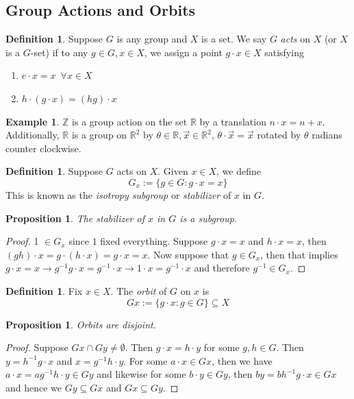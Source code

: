 \documentclass{article}
\newcommand{\R}{\mathbb{R}}
\newcommand{\Z}{\mathbb{Z}}
\newtheorem{proposition}[theorem]{Proposition}
\theoremstyle{definition}
\newtheorem{definition}[theorem]{Definition}
\newtheorem{example}[theorem]{Example}
\begin{document}
\subsection{Group Actions and Orbits}
\begin{definition}
    Suppose $G$ is any group and $X$ is a set. We say $G$ \emph{acts} on $X$ (or $X$ is a $G$-set) if to any $g\in G, x\in X$, we assign a point $g\cdot x \in X$ satisfying 
    \begin{enumerate}
        \item $e\cdot x=x\,\,\, \forall x\in X$
        \item $h\cdot (g\cdot x) = (hg)\cdot x$
    \end{enumerate}
\end{definition}
\begin{example}
    $\Z$ is a group action on the set $\R$ by a translation $n\cdot x=n+x$. Additionally, $\R$ is a group on $\R^2$ by $\theta \in \R, \vec{x}\in \R^2$, $\theta \cdot \vec{x} = \vec{x}$ rotated by $\theta$ radians counter clockwise. 
\end{example}
\begin{definition}
    Suppose $G$ acts on $X$. Given $x\in X$, we define 
    \begin{equation*}
        G_x := \{ g\in G: g\cdot x = x\}
    \end{equation*}
    This is known as the \emph{isotropy subgroup} or \emph{stabilizer} of $x$ in $G$.
\end{definition}
\begin{proposition}
    The stabilizer of $x$ in $G$ is a subgroup.
\end{proposition}
\begin{proof}
    1 $\in G_x$ since $1$ fixed everything. Suppose $g\cdot x=x $ and $h\cdot x=x$, then $(gh)\cdot x = g\cdot (h\cdot x) = g\cdot x=x$. Now suppose that $g\in G_x$, then that implies $g\cdot x= x \to g^{-1}g\cdot x=g^{-1}\cdot x\to 1\cdot x=g^{-1}\cdot x$ and therefore $g^{-1} \in G_x$.
\end{proof}
\begin{definition}
    Fix $x\in X$. The \emph{orbit} of $G$ on $x$ is 
    \begin{equation*}
        Gx := \{ g\cdot x: g\in G\} \subseteq X
    \end{equation*}
\end{definition}
\begin{proposition}
    Orbits are disjoint.
\end{proposition}
\begin{proof}
    Suppose $Gx\cap Gy \neq \emptyset$. Then $g\cdot x = h\cdot y$ for some $g,h \in G$. Then $y = h^{-1}g\cdot x$ and $x=g^{-1}h\cdot y$. For some $a\cdot x \in Gx$, then we have $a\cdot x=ag^{-1}h\cdot y \in Gy$ and likewise for some $b\cdot y \in Gy$, then $by = bh^{-1}g\cdot x \in Gx$ and hence we $Gy\subseteq Gx$ and $Gx \subseteq Gy$.
\end{proof}
\end{document}
